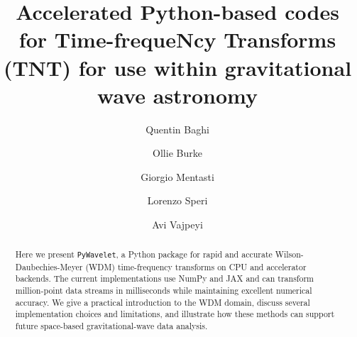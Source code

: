 \documentclass[%
 reprint,
superscriptaddress,
nofootinbib,
 amsmath,amssymb,
 aps,
colorlinks = true, 
linkcolor = blue, 
urlcolor = blue, 
citecolor = blue, 
anchorcolor = blue,
]{revtex4-2}
\newcommand{\package}{\texttt{PyWavelet}}
\begin{document}

\title{Accelerated Python-based codes for Time-frequeNcy Transforms (TNT) for use within gravitational wave astronomy}


\author{Quentin Baghi}
\author{Ollie Burke}
\author{Giorgio Mentasti}
\author{Lorenzo Speri}
\author{Avi Vajpeyi}



\begin{abstract}
    Here we present \package, a Python package for rapid and accurate Wilson-Daubechies-Meyer (WDM) time-frequency transforms on CPU and accelerator backends. The current implementations use NumPy and JAX and can transform million-point data streams in milliseconds while maintaining excellent numerical accuracy. We give a practical introduction to the WDM domain, discuss several implementation choices and limitations, and illustrate how these methods can support future space-based gravitational-wave data analysis.
    
\end{abstract}

\maketitle
\end{document}
